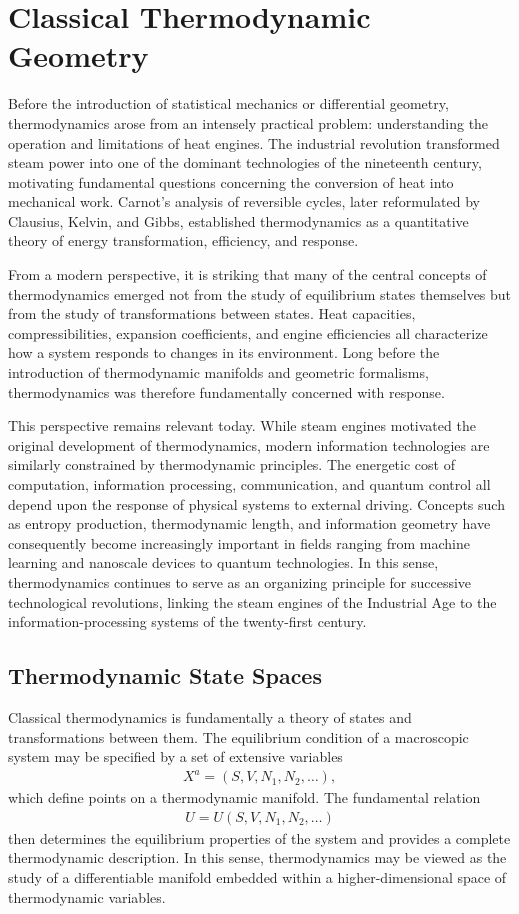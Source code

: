\section{Classical Thermodynamic Geometry}\label{sec:classical}

Before the introduction of statistical mechanics or differential geometry, thermodynamics arose from an intensely practical problem: understanding the operation and limitations of heat engines. The industrial revolution transformed steam power into one of the dominant technologies of the nineteenth century, motivating fundamental questions concerning the conversion of heat into mechanical work. Carnot’s analysis of reversible cycles, later reformulated by Clausius, Kelvin, and Gibbs, established thermodynamics as a quantitative theory of energy transformation, efficiency, and response.

From a modern perspective, it is striking that many of the central concepts of thermodynamics emerged not from the study of equilibrium states themselves but from the study of transformations between states. Heat capacities, compressibilities, expansion coefficients, and engine efficiencies all characterize how a system responds to changes in its environment. Long before the introduction of thermodynamic manifolds and geometric formalisms, thermodynamics was therefore fundamentally concerned with response.

This perspective remains relevant today. While steam engines motivated the original development of thermodynamics, modern information technologies are similarly constrained by thermodynamic principles. The energetic cost of computation, information processing, communication, and quantum control all depend upon the response of physical systems to external driving. Concepts such as entropy production, thermodynamic length, and information geometry have consequently become increasingly important in fields ranging from machine learning and nanoscale devices to quantum technologies. In this sense, thermodynamics continues to serve as an organizing principle for successive technological revolutions, linking the steam engines of the Industrial Age to the information-processing systems of the twenty-first century.

\subsection{Thermodynamic State Spaces}

Classical thermodynamics is fundamentally a theory of states and transformations between them. The equilibrium condition of a macroscopic system may be specified by a set of extensive variables
\begin{align}
X^a=(S,V,N_1,N_2,\ldots),
\end{align}
which define points on a thermodynamic manifold. The fundamental relation
\begin{align}
U = U(S,V,N_1,N_2,\ldots)
\end{align}
then determines the equilibrium properties of the system and provides a complete thermodynamic description. In this sense, thermodynamics may be viewed as the study of a differentiable manifold embedded within a higher-dimensional space of thermodynamic variables.

